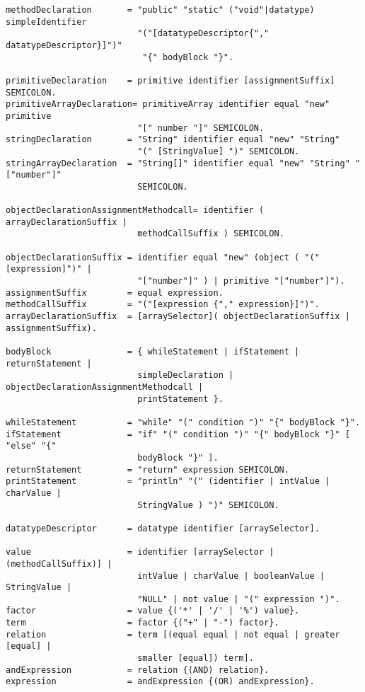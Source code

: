 \begin{verbatim}
methodDeclaration       = "public" "static" ("void"|datatype) simpleIdentifier
                          "("[datatypeDescriptor{"," datatypeDescriptor}]")" 
                           "{" bodyBlock "}".

primitiveDeclaration    = primitive identifier [assignmentSuffix] SEMICOLON.
primitiveArrayDeclaration= primitiveArray identifier equal "new" primitive 
                          "[" number "]" SEMICOLON.
stringDeclaration       = "String" identifier equal "new" "String" 
                          "(" [StringValue] ")" SEMICOLON.
stringArrayDeclaration	= "String[]" identifier equal "new" "String" "["number"]" 
                          SEMICOLON.

objectDeclarationAssignmentMethodcall= identifier ( arrayDeclarationSuffix | 
                          methodCallSuffix ) SEMICOLON.

objectDeclarationSuffix = identifier equal "new" (object ( "("[expression]")" |
                          "["number"]" ) | primitive "["number"]").
assignmentSuffix        = equal expression.
methodCallSuffix        = "("[expression {"," expression}]")".
arrayDeclarationSuffix  = [arraySelector]( objectDeclarationSuffix | assignmentSuffix).
 
bodyBlock               = { whileStatement | ifStatement | returnStatement | 
                          simpleDeclaration | objectDeclarationAssignmentMethodcall | 
                          printStatement }.

whileStatement          = "while" "(" condition ")" "{" bodyBlock "}".
ifStatement             = "if" "(" condition ")" "{" bodyBlock "}" [ "else" "{" 
                          bodyBlock "}" ].
returnStatement         = "return" expression SEMICOLON.
printStatement          = "println" "(" (identifier | intValue | charValue | 
                          StringValue ) ")" SEMICOLON.

datatypeDescriptor      = datatype identifier [arraySelector].

value                   = identifier [arraySelector | (methodCallSuffix)] | 
                          intValue | charValue | booleanValue | StringValue |
                          "NULL" | not value | "(" expression ")".
factor                  = value {('*' | '/' | '%') value}.
term                    = factor {("+" | "-") factor}.
relation                = term [(equal equal | not equal | greater [equal] | 
                          smaller [equal]) term].
andExpression           = relation {(AND) relation}.
expression              = andExpression {(OR) andExpression}.


\end{verbatim}
